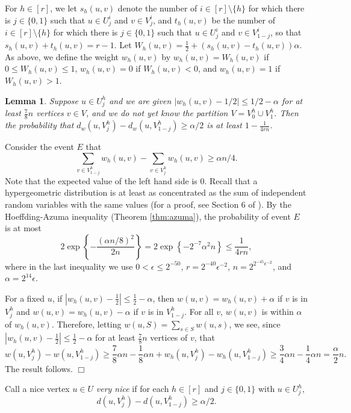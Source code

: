\documentclass[11pt]{article}
\newtheorem{lemma}{Lemma}[section]
\newenvironment{proof}
      {\medskip\noindent{\bf Proof:}\hspace{1mm}}
      {\hfill$\Box$\medskip}
\begin{document}
For $h \in [r]$, we let $s_h(u,v)$ denote the number of $i \in [r] \setminus
\{h\}$ for which there is $j \in \{0,1\}$ such that $u \in U^i_j$ and $v \in
V^i_j$, and $t_h(u,v)$ be the number of $i \in [r] \setminus \{h\}$ for which
there is $j \in \{0,1\}$ such that $u \in U^i_j$ and $v \in V^i_{1-j}$, so that
$s_h(u,v)+t_h(u,v)=r-1$. Let $W_h(u,v)=\frac{1}{2}+(s_h(u,v)-t_h(u,v))\alpha$.
As above, we define the weight $w_h(u,v)$ by  $w_h(u,v)=W_h(u,v)$ if $0 \leq
W_h(u,v) \leq 1$, $w_h(u,v)=0$ if $W_h(u,v) < 0$, and $w_h(u,v)=1$ if $W_h(u,v)
> 1$.

\begin{lemma}\label{nicevery}
Suppose $u \in U^h_j$ and we are given $|w_h(u,v)-1/2| \leq 1/2-\alpha$ for at
least $\frac{7}{8}n$ vertices $v \in V$, and we do not yet know the partition
$V=V^h_0 \cup V^h_1$. Then the probability that
$d_w(u,V^h_j)-d_w(u,V^h_{1-j}) \geq \alpha/2$ is at least $1-\frac{1}{4rn}$.
\end{lemma}
\begin{proof}
Consider the event $E$ that
$$\sum_{v \in V^h_{1-j}} w_h(u,v)-\sum_{v \in V^h_j} w_h(u,v) \geq \alpha
n/4.$$
Note that the expected value of the left hand side is $0$. Recall that a
hypergeometric distribution is at least as concentrated as the sum of
independent random variables with the same values (for a proof, see Section 6
of \cite{Ho}). By the Hoeffding-Azuma inequality (Theorem \ref{thm:azuma}), the
probability of event $E$ is at most
$$2\exp\left \{-\frac{(\alpha n/8)^2}{2n}\right \} = 2\exp \left
\{-2^{-7}\alpha^2n\right \} \leq \frac{1}{4rn},$$
where in the last inequality we use $0<\epsilon \leq 2^{-50}$,
$r=2^{-40}\epsilon^{-2}$, $n=2^{2^{-45}\epsilon^{-2}}$, and
$\alpha=2^{14}\epsilon$.

For a fixed $u$, if $|w_h(u,v) - \frac{1}{2}| \leq \frac{1}{2} - \alpha$, then
$w(u,v) = w_h(u,v) + \alpha$ if $v$ is in $V_j^h$ and $w(u,v) = w_h(u,v) -
\alpha$ if $v$ is in $V_{1-j}^h$. For all $v$, $w(u,v)$ is within $\alpha$ of
$w_h(u,v)$. Therefore, letting $w(u, S) = \sum_{s \in S} w(u, s)$, we see, since
$|w_h(u,v) - \frac{1}{2}| \leq \frac{1}{2} - \alpha$ for at least
$\frac{7}{8}n$ vertices of $v$, that
\[w(u, V_j^h) - w(u,V_{1-j}^h) \geq \frac{7}{8} \alpha n - \frac{1}{8}\alpha n
+ w_h(u, V^h_j) - w_h(u, V_{1-j}^h) \geq \frac{3}{4} \alpha n - \frac{1}{4}
\alpha n = \frac{\alpha}{2} n.\]
The result follows.
\end{proof}

Call a nice vertex $u \in U$ {\it very nice} if for each $h \in [r]$ and $j \in
\{0,1\}$ with $u \in U^h_j$, $$d(u,V^h_j)-d(u,V^h_{1-j}) \geq \alpha/2.$$
\end{document}
